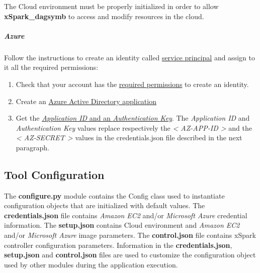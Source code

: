 The Cloud environment must be properly initialized in order to allow
\textbf{xSpark\_dagsymb} to access and modify resources in the cloud.

\hypertarget{azure}{%
\subparagraph{Azure}\label{azure}}

Follow the instructions to create an identity called
\href{https://docs.microsoft.com/en-us/azure/azure-resource-manager/resource-group-create-service-principal-portal}{service
principal} and assign to it all the required permissions:

\begin{enumerate}
\def\labelenumi{\arabic{enumi})}
\item
Check that your account has the
\href{https://docs.microsoft.com/en-us/azure/azure-resource-manager/resource-group-create-service-principal-portal?view=azure-cli-latest\#required-permissions}{required
	permissions} to create an identity.
\item
Create an
\href{https://docs.microsoft.com/en-us/azure/azure-resource-manager/resource-group-create-service-principal-portal?view=azure-cli-latest\#create-an-azure-active-directory-application}{Azure
	Active Directory application}
\item
Get the
\href{https://docs.microsoft.com/en-us/azure/azure-resource-manager/resource-group-create-service-principal-portal?view=azure-cli-latest\#get-application-id-and-authentication-key}{\emph{Application
		ID} and an \emph{Authentication Key}}. The \emph{Application ID} and
\emph{Authentication Key} values replace respectively the
\emph{\textless{} AZ-APP-ID \textgreater{}} and the \emph{\textless{}
	AZ-SECRET \textgreater{}} values in the credentials.json file
described in the next paragraph.
\end{enumerate}

\hypertarget{tool-configuration}{%
\subsection{Tool Configuration}\label{tool-configuration}}

The \textbf{configure.py} module contains the Config class used to
instantiate configuration objects that are initialized with default
values. The \textbf{credentials.json} file contains \emph{Amazon EC2}
and/or \emph{Microsoft Azure} credential information. The
\textbf{setup.json} contains Cloud environment and \emph{Amazon EC2}
and/or \emph{Microsoft Azure} image parameters. The
\textbf{control.json} file contains xSpark controller configuration
parameters. Information in the \textbf{credentials.json},
\textbf{setup.json} and \textbf{control.json} files are used to
customize the configuration object used by other modules during the
application execution.

